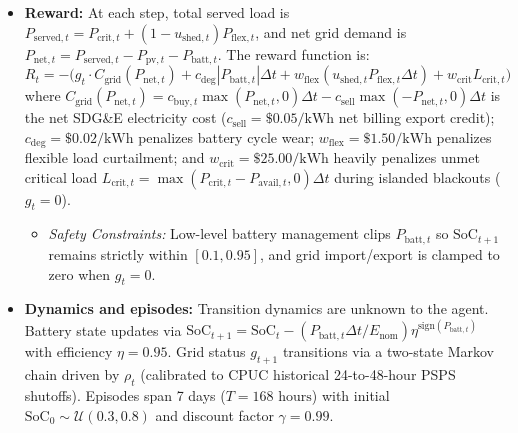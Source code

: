 \documentclass[11pt,letterpaper]{article}
\begin{document}
\begin{itemize}
  \item \textbf{Reward:} At each step, total served load is $P_{\text{served},t} = P_{\text{crit},t} + (1 - u_{\text{shed},t})P_{\text{flex},t}$, and net grid demand is $P_{\text{net},t} = P_{\text{served},t} - P_{\text{pv},t} - P_{\text{batt},t}$. The reward function is:
  \begin{equation*}
    R_t = -\Big( g_t \cdot C_{\text{grid}}(P_{\text{net},t}) + c_{\text{deg}}|P_{\text{batt},t}|\Delta t + w_{\text{flex}}(u_{\text{shed},t} P_{\text{flex},t}\Delta t) + w_{\text{crit}} L_{\text{crit},t} \Big)
  \end{equation*}
  where $C_{\text{grid}}(P_{\text{net},t}) = c_{\text{buy},t}\max(P_{\text{net},t}, 0)\Delta t - c_{\text{sell}}\max(-P_{\text{net},t}, 0)\Delta t$ is the net SDG\&E electricity cost ($c_{\text{sell}} = \$0.05/\text{kWh}$ net billing export credit); $c_{\text{deg}} = \$0.02/\text{kWh}$ penalizes battery cycle wear; $w_{\text{flex}} = \$1.50/\text{kWh}$ penalizes flexible load curtailment; and $w_{\text{crit}} = \$25.00/\text{kWh}$ heavily penalizes unmet critical load $L_{\text{crit},t} = \max(P_{\text{crit},t} - P_{\text{avail},t}, 0)\Delta t$ during islanded blackouts ($g_t = 0$).
  \begin{itemize}
    \item \emph{Safety Constraints:} Low-level battery management clips $P_{\text{batt},t}$ so $\text{SoC}_{t+1}$ remains strictly within $[0.1, 0.95]$, and grid import/export is clamped to zero when $g_t = 0$.
  \end{itemize}

  \item \textbf{Dynamics and episodes:} Transition dynamics are unknown to the agent. Battery state updates via $\text{SoC}_{t+1} = \text{SoC}_t - (P_{\text{batt},t}\Delta t / E_{\text{nom}})\eta^{\text{sign}(P_{\text{batt},t})}$ with efficiency $\eta = 0.95$. Grid status $g_{t+1}$ transitions via a two-state Markov chain driven by $\rho_t$ (calibrated to CPUC historical 24-to-48-hour PSPS shutoffs). Episodes span 7 days ($T = 168\text{ hours}$) with initial $\text{SoC}_0 \sim \mathcal{U}(0.3, 0.8)$ and discount factor $\gamma = 0.99$.
\end{itemize}
\end{document}
